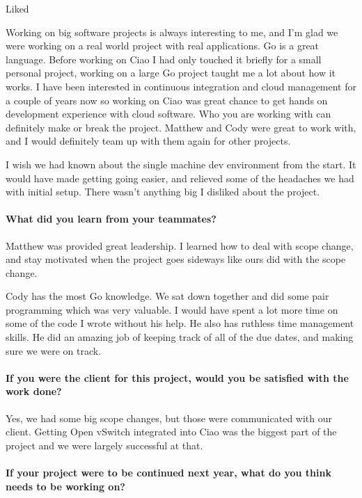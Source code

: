 \documentclass[10pt,onecolumn,journal,draftclsnofoot]{IEEEtran}
\begin{document}
Liked

Working on big software projects is always interesting to me, and I'm
glad we were working on a real world project with real applications. Go
is a great language. Before working on Ciao I had only touched it
briefly for a small personal project, working on a large Go project
taught me a lot about how it works. I have been interested in continuous
integration and cloud management for a couple of years now so working on
Ciao was great chance to get hands on development experience with cloud
software. Who you are working with can definitely make or break the
project. Matthew and Cody were great to work with, and I would
definitely team up with them again for other projects.

I wish we had known about the single machine dev environment from the
start. It would have made getting going easier, and relieved some of the
headaches we had with initial setup. There wasn't anything big I
disliked about the project.

\paragraph{What did you learn from your
teammates?} 

Matthew was provided great leadership. I learned how to deal with scope
change, and stay motivated when the project goes sideways like ours did
with the scope change.

Cody has the most Go knowledge. We sat down together and did some pair
programming which was very valuable. I would have spent a lot more time
on some of the code I wrote without his help. He also has ruthless time
management skills. He did an amazing job of keeping track of all of the
due dates, and making sure we were on track.

\paragraph{If you were the client for this project, would you be
satisfied with the work
done?} 
Yes, we had some big scope changes, but those were communicated with
our client. Getting Open vSwitch integrated into Ciao was the biggest
part of the project and we were largely successful at that.

\paragraph{If your project were to be continued next year, what do
you think needs to be working
on?} 
\end{document}
